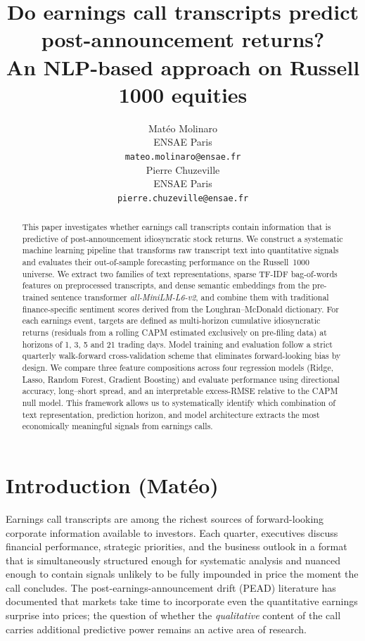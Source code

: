 \documentclass{article}
\title{Do earnings call transcripts predict post-announcement returns?\\
 \vspace{0.2cm} \textnormal{\large An NLP-based approach on Russell 1000 equities}}
\author{%
  Matéo Molinaro \\
  ENSAE Paris \\
  \texttt{mateo.molinaro@ensae.fr} \\
  \And
  Pierre Chuzeville \\
  ENSAE Paris \\
  \texttt{pierre.chuzeville@ensae.fr} \\
}
\begin{document}
\maketitle

\begin{abstract}
This paper investigates whether earnings call transcripts contain information that is predictive of post-announcement idiosyncratic stock returns. We construct a systematic machine learning pipeline that transforms raw transcript text into quantitative signals and evaluates their out-of-sample forecasting performance on the Russell~1000 universe. We extract two families of text representations, sparse TF-IDF bag-of-words features on preprocessed transcripts, and dense semantic embeddings from the pre-trained sentence transformer \textit{all-MiniLM-L6-v2}, and combine them with traditional finance-specific sentiment scores derived from the Loughran--McDonald dictionary. For each earnings event, targets are defined as multi-horizon cumulative idiosyncratic returns (residuals from a rolling CAPM estimated exclusively on pre-filing data) at horizons of 1, 3, 5 and 21 trading days. Model training and evaluation follow a strict quarterly walk-forward cross-validation scheme that eliminates forward-looking bias by design. We compare three feature compositions across four regression models (Ridge, Lasso, Random Forest, Gradient Boosting) and evaluate performance using directional accuracy, long--short spread, and an interpretable excess-RMSE relative to the CAPM null model. This framework allows us to systematically identify which combination of text representation, prediction horizon, and model architecture extracts the most economically meaningful signals from earnings calls.
\end{abstract}

\tableofcontents
\newpage

\section{Introduction (Matéo)}

Earnings call transcripts are among the richest sources of forward-looking corporate information available to investors. Each quarter, executives discuss financial performance, strategic priorities, and the business outlook in a format that is simultaneously structured enough for systematic analysis and nuanced enough to contain signals unlikely to be fully impounded in price the moment the call concludes. The post-earnings-announcement drift (PEAD) literature has documented that markets take time to incorporate even the quantitative earnings surprise into prices; the question of whether the \textit{qualitative} content of the call carries additional predictive power remains an active area of research.\\
\end{document}
